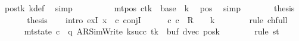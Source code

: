\begin{isabellebody}
\ pos{}{\isacharunderscore}{\kern0pt}tk\ kdef\ \isamarkupfalse%
\ simp\isanewline
\ \ \ \ \isamarkupfalse%
\ \isamarkupfalse%
\ {\isachardoublequoteopen}{\isasymdots}\ {\isacharequal}{\kern0pt}\ {\isacharparenleft}{\kern0pt}mt{\isacharunderscore}{\kern0pt}pos\ c{\isacharprime}{\kern0pt}{\isacharparenright}{\kern0pt}{\isacharparenleft}{\kern0pt}tk\ {\isacharcolon}{\kern0pt}{\isacharequal}{\kern0pt}\ base\ {\isacharplus}{\kern0pt}\ {\isacharquery}{\kern0pt}k{\isacharparenright}{\kern0pt}{\isachardoublequoteclose}\ \isamarkupfalse%
\ pos{}\ \isamarkupfalse%
\ simp\isanewline
\ \ \ \ \isamarkupfalse%
\ \isamarkupfalse%
\ {\isacharquery}{\kern0pt}thesis\ \isakeywordONE{{\isachardot}{\kern0pt}}\isamarkupfalse%
\isanewline
\ \ \isamarkupfalse%
\isanewline
\ \ \isamarkupfalse%
\ {\isacharquery}{\kern0pt}thesis\isanewline
\ \ \isamarkupfalse%
\ {\isacharparenleft}{\kern0pt}intro\ exI{\isacharbrackleft}{\kern0pt}\ x\ {\isacharequal}{\kern0pt}\ c{}{\isacharbrackright}{\kern0pt}\ conjI{\isacharparenright}{\kern0pt}\isanewline
\ \ \ \ \isamarkupfalse%
\ {\isachardoublequoteopen}{\isacharparenleft}{\kern0pt}c{\isacharprime}{\kern0pt}{\isacharcomma}{\kern0pt}\ c{}{\isacharparenright}{\kern0pt}\ {\isasymin}\ R{\isacharprime}{\kern0pt}\ {\isacharcircum}{\kern0pt}{\isacharcircum}{\kern0pt}\ {\isacharparenleft}{\kern0pt}{}\ {\isacharasterisk}{\kern0pt}\ {\isacharquery}{\kern0pt}k{\isacharparenright}{\kern0pt}{\isachardoublequoteclose}\isanewline
\ \ \ \ \ \ \isamarkupfalse%
\ {\isacharparenleft}{\kern0pt}rule\ ch{\isacharunderscore}{\kern0pt}full{\isacharparenright}{\kern0pt}\isanewline
\ \ \ \ \isamarkupfalse%
\ {\isachardoublequoteopen}mt{\isacharunderscore}{\kern0pt}state\ c{}\ {\isacharequal}{\kern0pt}\ {\isacharparenleft}{\kern0pt}q{\isacharcomma}{\kern0pt}\ AR{\isacharunderscore}{\kern0pt}SimWrite{\isacharcomma}{\kern0pt}\ k{\isacharunderscore}{\kern0pt}succ\ tk{\isacharcomma}{\kern0pt}\ {}{\isacharcomma}{\kern0pt}\ buf{\isacharcomma}{\kern0pt}\ dvec{\isacharcomma}{\kern0pt}\ posk{\isacharparenright}{\kern0pt}{\isachardoublequoteclose}\isanewline
\ \ \ \ \ \ \isamarkupfalse%
\ {\isacharparenleft}{\kern0pt}rule\ st{}{\isacharparenright}{\kern0pt}\isanewline
\ \ \ \ \isamarkupfalse%

\end{isabellebody}
